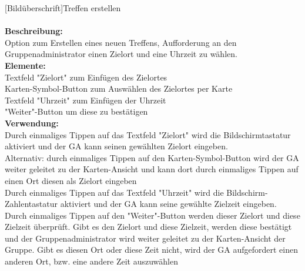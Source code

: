 [Bildüberschrift]Treffen erstellen \\ \\
\textbf{Beschreibung:}\\
Option zum Erstellen eines neuen Treffens, Aufforderung an den Gruppenadministrator einen Zielort und eine Uhrzeit zu wählen.\\
\textbf{Elemente:}\\
Textfeld "Zielort" zum Einfügen des Zielortes\\
Karten-Symbol-Button zum Auswählen des Zielortes per Karte\\
Textfeld "Uhrzeit" zum Einfügen der Uhrzeit\\
"Weiter"-Button um diese zu bestätigen\\
\textbf{Verwendung:}\\
Durch einmaliges Tippen auf das Textfeld "Zielort" wird die Bildschirmtastatur aktiviert und der GA kann seinen gewählten Zielort eingeben.\\
Alternativ: durch einmaliges Tippen auf den Karten-Symbol-Button wird der GA weiter geleitet zu der Karten-Ansicht und kann dort durch einmaliges Tippen auf einen Ort diesen als Zielort eingeben\\
Durch einmaliges Tippen auf das Textfeld "Uhrzeit" wird die Bildschirm-Zahlentastatur aktiviert und der GA kann seine gewählte Zielzeit eingeben.\\
Durch einmaliges Tippen auf den "Weiter"-Button werden dieser Zielort und diese Zielzeit überprüft. Gibt es den Zielort und diese Zielzeit, werden diese bestätigt und der Gruppenadministrator wird weiter geleitet zu der Karten-Ansicht der Gruppe. Gibt es diesen Ort oder diese Zeit nicht, wird der GA aufgefordert einen anderen Ort, bzw. eine andere Zeit auszuwählen
\newpage



